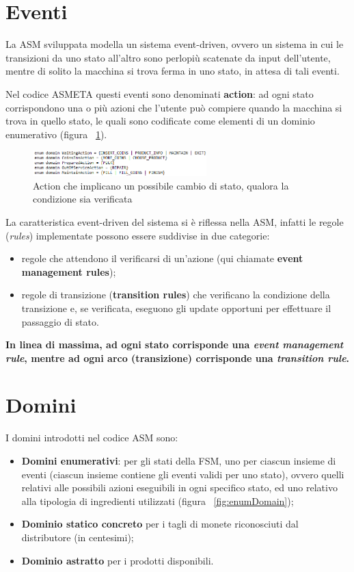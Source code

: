 \newpage
\section{Eventi}
La ASM sviluppata modella un sistema event-driven, ovvero un sistema in cui le transizioni da uno stato all’altro sono perlopiù scatenate da input dell’utente, mentre di solito la macchina si trova ferma in uno stato, in attesa di tali eventi.

Nel codice ASMETA questi eventi sono denominati \textbf{action}: ad ogni stato corrispondono una o più azioni che l’utente può compiere quando la macchina si trova in quello stato, le quali sono codificate come elementi di un dominio enumerativo (figura ~\ref{fig:actionASM}).

\begin{figure}[h]
	\centering
	\includegraphics[width=0.6\textwidth]{Immagini/ActionASM.png}
	\caption{Action che implicano un possibile cambio di stato, qualora la condizione sia verificata}
	\label{fig:actionASM}
\end{figure}

La caratteristica event-driven del sistema si è riflessa nella ASM, infatti le regole (\textit{rules}) implementate possono essere suddivise in due categorie:
\begin{itemize}
	\item  regole che attendono il verificarsi di un’azione (qui chiamate \textbf{event management rules});
	\item regole di transizione (\textbf{transition rules}) che verificano la condizione della transizione e, se verificata, eseguono gli update opportuni per effettuare il passaggio di stato.
\end{itemize}
	
\textbf{In linea di massima, ad ogni stato corrisponde una \textit{event management rule}, mentre ad ogni arco (transizione) corrisponde una \textit{transition rule}.}

\section{Domini}
I domini introdotti nel codice ASM sono:
\begin{itemize}
	\item \textbf{Domini enumerativi}: per gli stati della FSM, uno per ciascun insieme di eventi (ciascun insieme contiene gli eventi validi per uno stato), ovvero quelli relativi alle possibili azioni eseguibili in ogni specifico stato, ed uno relativo alla tipologia di ingredienti utilizzati (figura ~\ref{fig:enumDomain});
	\item \textbf{Dominio statico concreto} per i tagli di monete riconosciuti dal distributore (in centesimi);
	\item \textbf{Dominio astratto} per i prodotti disponibili.
\end{itemize}

